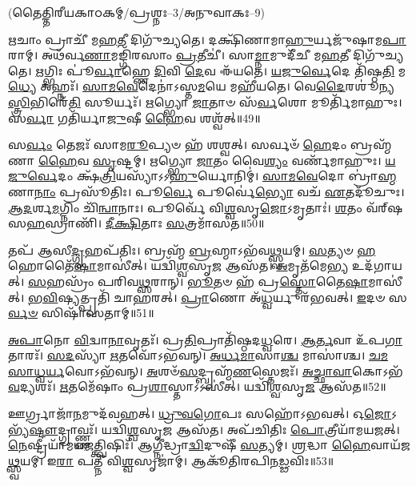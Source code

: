 \centerline{\scriptsize(𑌤𑍈𑌤𑍍𑌤𑌿𑌰𑍀𑌯𑌕𑌾𑌠𑌕𑌮𑍍/𑌪𑍍𑌰𑌶𑍍𑌨𑌃–3/𑌅𑌨𑍁𑌵𑌾𑌕𑌃–9)}

   \ul{𑌋}\-𑌚𑌾𑌂 𑌪𑍍𑌰𑌾𑌚𑍀᳴ 𑌮\-\ul{𑌹}\-𑌤𑍀 𑌦𑌿𑌗𑍁᳴𑌚𑍍𑌯𑌤𑍇।
   𑌦𑌕𑍍𑌷𑌿᳴𑌣𑌾𑌮𑌾\-\ul{𑌹𑍁}\-𑌰𑍍𑌯𑌜𑍁᳴𑌷𑌾𑌮\-\ul{𑌪𑌾}\-𑌰𑌾𑌮𑍍।
   𑌅𑌥᳴𑌰𑍍𑌵\-\ul{𑌣𑌾}\-𑌮𑌙𑍍𑌗𑌿᳴𑌰𑌸𑌾𑌂 \ul{𑌪𑍍𑌰}\-𑌤𑍀𑌚𑍀॑।
   𑌸𑌾\-\ul{𑌮𑍍𑌨𑌾}\-𑌮𑍁𑌦𑍀᳴𑌚𑍀 𑌮\-\ul{𑌹}\-𑌤𑍀 𑌦𑌿𑌗𑍁᳴𑌚𑍍𑌯𑌤𑍇।
   \ul{𑌋}\-𑌗𑍍𑌭𑌿𑌃 𑌪𑍂॑\-\ul{𑌰𑍍𑌵𑌾}\-𑌹𑍍𑌣𑍇 \ul{𑌦𑌿}\-𑌵𑌿 \ul{𑌦𑍇}\-𑌵 𑌈᳴𑌯𑌤𑍇।
   \ul{𑌯}\-\-\ul{𑌜𑍁}\-\-\ul{𑌰𑍍𑌵𑍇}\-𑌦𑍇 𑌤𑌿᳴𑌷𑍍𑌠\-\ul{𑌤𑌿} 𑌮\-\ul{𑌧𑍍𑌯𑍇} 𑌅𑌹𑍍𑌨𑌃᳴।
   \ul{𑌸𑌾}\-\-\ul{𑌮}\-\-\ul{𑌵𑍇}\-𑌦𑍇𑌨𑌾॑𑌽𑌸𑍍𑌤\-\ul{𑌮}\-𑌯𑍇 𑌮𑌹𑍀᳴𑌯𑌤𑍇।
   𑌵𑍇\-\ul{𑌦𑍈}\-𑌰𑌶𑍂॑𑌨𑍍𑌯\-\ul{𑌸𑍍𑌤𑍍𑌰𑌿}\-𑌭𑌿𑌰𑍇᳴\-\ul{𑌤𑌿} 𑌸𑍂𑌰𑍍𑌯𑌃᳴।
   \ul{𑌋}\-𑌗𑍍𑌭𑍍𑌯𑍋 \ul{𑌜𑌾}\-𑌤𑌾𑍞 𑌸᳴\-\ul{𑌰𑍍𑌵}\-𑌶𑍋 𑌮𑍂𑌰𑍍𑌤𑌿᳴𑌮𑌾𑌹𑍁𑌃।
   𑌸\-\ul{𑌰𑍍𑌵𑌾} 𑌗𑌤𑌿᳴𑌰𑍍𑌯𑌾\-\ul{𑌜𑍁}\-𑌷𑍀 \ul{𑌹𑍈}\-𑌵 𑌶𑌶𑍍𑌵᳴𑌤𑍍॥49॥

   𑌸\-\ul{𑌰𑍍𑌵𑌂} 𑌤𑍇𑌜𑌃᳴ 𑌸𑌾𑌮\-\ul{𑌰𑍂}\-𑌪𑍍𑌯𑍞 𑌹᳴ 𑌶𑌶𑍍𑌵𑌤𑍍।
   𑌸𑌰𑍍𑌵𑍞᳴ \ul{𑌹𑍇}\-𑌦𑌂 𑌬𑍍𑌰𑌹𑍍𑌮᳴𑌣𑌾 \ul{𑌹𑍈}\-𑌵 \ul{𑌸𑍃}\-𑌷𑍍𑌟𑌮𑍍।
   \ul{𑌋}\-𑌗𑍍𑌭𑍍𑌯𑍋 \ul{𑌜𑌾}\-𑌤𑌂 𑌵𑍈\-\ul{𑌶𑍍𑌯𑌂} 𑌵𑌰𑍍𑌣᳴𑌮𑌾𑌹𑍁𑌃।
   \ul{𑌯}\-\-\ul{𑌜𑍁}\-\-\ul{𑌰𑍍𑌵𑍇}\-𑌦𑌂 𑌕𑍍𑌷᳴\-\ul{𑌤𑍍𑌰𑌿}\-𑌯𑌸𑍍𑌯𑌾᳴𑌽𑌽\-\ul{𑌹𑍁}\-𑌰𑍍𑌯𑍋𑌨𑌿𑌮𑍍॑।
   \ul{𑌸𑌾}\-\-\ul{𑌮}\-\-\ul{𑌵𑍇}\-𑌦𑍋 𑌬𑍍𑌰𑌾॑\-\ul{𑌹𑍍𑌮}\-𑌣𑌾\-\ul{𑌨𑌾𑌂} 𑌪𑍍𑌰𑌸𑍂᳴𑌤𑌿𑌃।
   𑌪𑍂\-\ul{𑌰𑍍𑌵𑍇} 𑌪𑍂𑌰𑍍𑌵𑍇॑\-\ul{𑌭𑍍𑌯𑍋} 𑌵𑌚᳴ \ul{𑌏}\-𑌤𑌦𑍂᳴𑌚𑍁𑌃।
   \ul{𑌆}\-\-\ul{𑌦}\-𑌰𑍍\mbox{}𑌶\-\ul{𑌮}\-𑌗𑍍𑌨𑌿𑌂 𑌚𑌿᳴\-\ul{𑌨𑍍𑌵𑌾}\-𑌨𑌾𑌃।
   𑌪𑍂𑌰𑍍𑌵𑍇᳴ 𑌵𑌿\-\ul{𑌶𑍍𑌵}\-𑌸𑍃\-\ul{𑌜𑍋}\-𑌽𑌮𑍃𑌤𑌾𑌃॑।
   \ul{𑌶}\-𑌤𑌂 𑌵᳴𑌰𑍍‌𑌷𑌸\-\ul{𑌹}\-𑌸𑍍𑌰𑌾𑌣𑌿᳴।
   \ul{𑌦𑍀}\-\-\ul{𑌕𑍍𑌷𑌿}\-𑌤𑌾𑌃 \ul{𑌸}\-𑌤𑍍𑌰𑌮𑌾᳴𑌸𑌤॥50॥

   𑌤𑌪᳴ 𑌆𑌸𑍀\-\ul{𑌦𑍍𑌗𑍃}\-𑌹𑌪᳴𑌤𑌿𑌃।
   𑌬𑍍𑌰𑌹𑍍𑌮᳴ \ul{𑌬𑍍𑌰}\-𑌹𑍍𑌮𑌾𑌽𑌭᳴𑌵\-\ul{𑌥𑍍𑌸𑍍𑌵}\-𑌯𑌮𑍍।
   \ul{𑌸}\-𑌤𑍍𑌯𑍞 \ul{𑌹} 𑌹𑍋𑌤𑍈᳴\-\ul{𑌷𑌾}\-𑌮𑌾𑌸𑍀॑𑌤𑍍।
   𑌯𑌦𑍍𑌵𑌿᳴\-\ul{𑌶𑍍𑌵}\-𑌸𑍃\-\ul{𑌜} 𑌆𑌸᳴𑌤।
   \ul{𑌅}\-𑌮𑍃𑌤᳴𑌮𑍇\-\ul{𑌭𑍍𑌯} 𑌉𑌦᳴𑌗𑌾𑌯𑌤𑍍।
   \ul{𑌸}\-𑌹𑌸𑍍𑌰𑌂᳴ 𑌪𑌰𑌿𑌵\-\ul{𑌥𑍍𑌸}\-𑌰𑌾𑌨𑍍।
   \ul{𑌭𑍂}\-𑌤𑍞 𑌹᳴ 𑌪𑍍𑌰\-\ul{𑌸𑍍𑌤𑍋}\-𑌤𑍈\-\ul{𑌷𑌾}\-𑌮𑌾𑌸𑍀॑𑌤𑍍।
   \ul{𑌭}\-\-\ul{𑌵𑌿}\-𑌷𑍍𑌯𑌤𑍍𑌪𑍍𑌰𑌤𑌿᳴ 𑌚𑌾𑌹𑌰𑌤𑍍।
   \ul{𑌪𑍍𑌰𑌾}\-𑌣𑍋 𑌅᳴\-\ul{𑌧𑍍𑌵}\-𑌰𑍍𑌯𑍁𑌰᳴𑌭𑌵𑌤𑍍।
   \ul{𑌇}\-𑌦𑍞 𑌸\-\ul{𑌰𑍍𑌵}\-\-\ul{𑍞} 𑌸𑌿𑌷𑌾᳴𑌸𑌤𑌾𑌮𑍍॥51॥

   \ul{𑌅}\-\-\ul{𑌪𑌾}\-𑌨𑍋 \ul{𑌵𑌿}\-𑌦𑍍𑌵𑌾\-\ul{𑌨𑌾}\-𑌵𑍃𑌤𑌃᳴।
   𑌪𑍍𑌰\-\ul{𑌤𑌿}\-𑌪𑍍𑌰𑌾𑌤𑌿᳴𑌷𑍍𑌠𑌦\-\ul{𑌧𑍍𑌵}\-𑌰𑍇।
   \ul{𑌆}\-\-\ul{𑌰𑍍𑌤}\-𑌵𑌾 𑌉᳴𑌪\-\ul{𑌗𑌾}\-𑌤𑌾𑌰𑌃᳴।
   \ul{𑌸}\-\-\ul{𑌦}\-𑌸𑍍𑌯𑌾᳴ \ul{𑌋}\-𑌤𑌵𑍋᳴𑌽𑌭𑌵𑌨𑍍।
   \ul{𑌅}\-\-\ul{𑌰𑍍𑌧}\-\-\ul{𑌮𑌾}\-𑌸𑌾\-\ul{𑌶𑍍𑌚} 𑌮𑌾𑌸𑌾॑𑌶𑍍𑌚।
   \ul{𑌚}\-\-\ul{𑌮}\-\-\ul{𑌸𑌾}\-\-\ul{𑌧𑍍𑌵}\-\-\ul{𑌰𑍍𑌯}\-𑌵𑍋𑌽𑌭᳴𑌵𑌨𑍍।
   \ul{𑌅}\-𑌶𑍞᳴\-\ul{𑌸}\-𑌦𑍍𑌬𑍍𑌰𑌹𑍍𑌮᳴\-\ul{𑌣}\-𑌸𑍍𑌤𑍇𑌜𑌃᳴।
   \ul{𑌅}\-\-\ul{𑌚𑍍𑌛𑌾}\-\-\ul{𑌵𑌾}\-𑌕𑍋𑌽𑌭᳴\-\ul{𑌵}\-𑌦𑍍𑌯𑌶𑌃᳴।
   \ul{𑌋}\-𑌤𑌮𑍇᳴𑌷𑌾𑌂 𑌪𑍍𑌰\-\ul{𑌶𑌾}\-𑌸𑍍𑌤𑌾𑌽𑌽𑌸𑍀॑𑌤𑍍।
   𑌯𑌦𑍍𑌵𑌿᳴\-\ul{𑌶𑍍𑌵}\-𑌸𑍃\-\ul{𑌜} 𑌆𑌸᳴𑌤॥52॥

   𑌊𑌰𑍍𑌗𑍍𑌰𑌾𑌜𑌾᳴\-\ul{𑌨}\-𑌮𑍁𑌦᳴𑌵𑌹𑌤𑍍।
   \ul{𑌧𑍍𑌰𑍁}\-\-\ul{𑌵}\-\-\ul{𑌗𑍋}\-𑌪𑌃 𑌸𑌹𑍋᳴𑌽𑌭𑌵𑌤𑍍।
   𑌓\-\ul{𑌜𑍋}\-𑌽𑌭𑍍𑌯᳴\-\ul{𑌷𑍍𑌟𑍗}\-\-𑌦𑍍𑌗𑍍𑌰𑌾𑌵𑍍𑌣𑍍𑌣𑌃᳴।
   𑌯𑌦𑍍𑌵𑌿᳴\-\ul{𑌶𑍍𑌵}\-𑌸𑍃\-\ul{𑌜} 𑌆𑌸᳴𑌤।
   𑌅𑌪᳴𑌚𑌿𑌤𑌿𑌃 \ul{𑌪𑍋}\-𑌤𑍍𑌰𑍀𑌯𑌾᳴𑌮𑌯𑌜𑌤𑍍।
   \ul{𑌨𑍇}\-𑌷𑍍𑌟𑍍𑌰𑍀𑌯𑌾᳴𑌮\-𑌯\-\ul{𑌜}\-𑌤𑍍𑌤𑍍𑌵𑌿𑌷𑌿𑌃᳴।
   𑌆𑌗𑍍𑌨𑍀॑𑌦𑍍𑌧𑍍𑌰𑌾\-\ul{𑌦𑍍𑌵𑌿}\-𑌦𑍁𑌷𑍀᳴ \ul{𑌸}\-𑌤𑍍𑌯𑌮𑍍।
   \ul{𑌶𑍍𑌰}\-𑌦𑍍𑌧𑌾 \ul{𑌹𑍈}\-𑌵𑌾𑌯᳴𑌜\-\ul{𑌥𑍍𑌸𑍍𑌵}\-𑌯𑌮𑍍।
   𑌇\-\ul{𑌰𑌾} 𑌪𑌤𑍍𑌨𑍀᳴ 𑌵𑌿\-\ul{𑌶𑍍𑌵}\-𑌸𑍃𑌜𑌾॑𑌮𑍍।
   𑌆𑌕𑍂᳴𑌤𑌿𑌰𑌪𑌿𑌨\-\-\ul{𑌡𑍍𑌢}\-𑌵𑌿𑌃॥53॥

